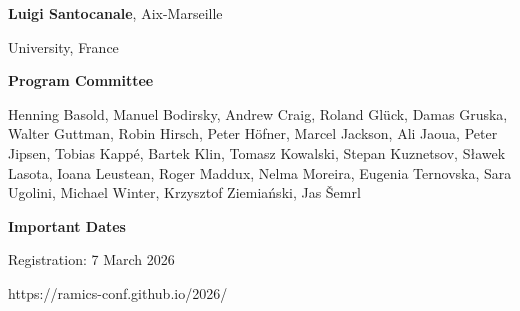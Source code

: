 \documentclass[a3paper, 12pt]{article}
\begin{document}
\begin{minipage}[t]{.43\linewidth}
  \hfill \textbf{Luigi Santocanale}, Aix-Marseille

  \hfill University, France

  \bigskip

  \hfill {\Large \bf Program Committee}

  \medskip

Henning Basold,
Manuel Bodirsky,
Andrew Craig,
Roland Glück,
Damas Gruska,
Walter Guttman,
Robin Hirsch,
Peter Höfner,
Marcel Jackson,
Ali Jaoua,
Peter Jipsen,
Tobias Kappé,
Bartek Klin,
Tomasz Kowalski,
Stepan Kuznetsov,
Sławek Lasota,
Ioana Leustean,
Roger Maddux,
Nelma Moreira,
Eugenia Ternovska,
Sara Ugolini,
Michael Winter,
Krzysztof Ziemiański,
Jas Šemrl
  
  \bigskip
  
  \hfill
  {\Large \bf Important Dates}

  \smallskip

  

  \hfill Registration: 7 March 2026
  


  \vspace{4ex}

  \hspace*{-15ex} {\fontsize{30}{40}\selectfont https://ramics-conf.github.io/2026/}

  \vspace*{-2ex}

\end{minipage}
\end{document}

